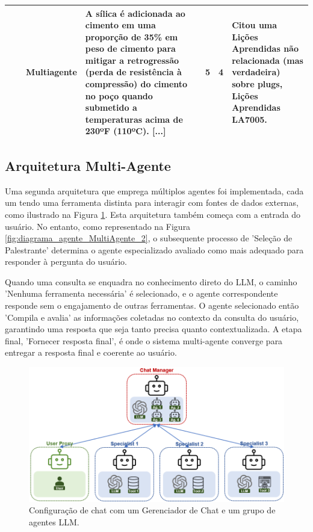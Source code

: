 \begin{adjustwidth}{-2cm}{-2cm}
\begin{table}[h!]
\begin{tabular}{p{2cm}p{1cm}p{1cm}p{6cm}p{1.3cm}p{1.2cm}p{2cm}}
            \cmidrule{3-7} 
             & & Multiagente & A sílica é adicionada ao cimento em uma proporção de 35\% em peso de cimento para mitigar a retrogressão (perda de resistência à compressão) do cimento no poço quando submetido a temperaturas acima de 230ºF (110ºC). [...] & 5 & 4 & Citou uma Lições Aprendidas não relacionada (mas verdadeira) sobre plugs, Lições Aprendidas LA7005. \\ 
            \bottomrule 
            \end{tabular} 
            \end{table}         
            \end{adjustwidth} 
    
    
        \subsection{Arquitetura Multi-Agente}        
        
            Uma segunda arquitetura que emprega múltiplos agentes foi implementada, cada um tendo uma ferramenta distinta para interagir com fontes de dados externas, como ilustrado na Figura \ref{fig:agent_config_2}. 
            Esta arquitetura também começa com a entrada do usuário. No entanto, como representado na Figura \ref{fig:diagrama_agente_MultiAgente_2}, o subsequente processo de 'Seleção de Palestrante' determina o agente especializado avaliado como mais adequado para responder à pergunta do usuário.            
            
            Quando uma consulta se enquadra no conhecimento direto do LLM, o caminho 'Nenhuma ferramenta necessária' é selecionado, e o agente correspondente responde sem o engajamento de outras ferramentas.
            O agente selecionado então 'Compila e avalia' as informações coletadas no contexto da consulta do usuário, garantindo uma resposta que seja tanto precisa quanto contextualizada. A etapa final, 'Fornecer resposta final', é onde o sistema multi-agente converge para entregar a resposta final e coerente ao usuário.
                
            \begin{figure}[h]
                \centering
                \includegraphics[width=.75\textwidth]{images/agent_config_2.png}
                \caption{Configuração de chat com um Gerenciador de Chat e um grupo de agentes LLM.}
                \label{fig:agent_config_2}
            \end{figure}            
            
